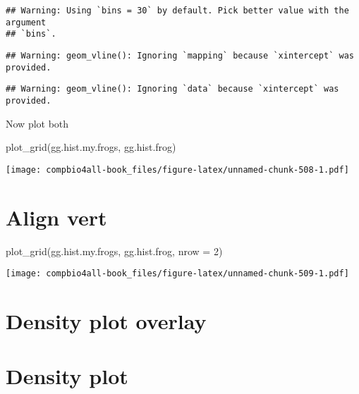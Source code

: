 \documentclass[
]{book}
\newenvironment{Shaded}{\begin{snugshade}}{\end{snugshade}}
\newcommand{\AttributeTok}[1]{\textcolor[rgb]{0.77,0.63,0.00}{#1}}
\newcommand{\DecValTok}[1]{\textcolor[rgb]{0.00,0.00,0.81}{#1}}
\newcommand{\FunctionTok}[1]{\textcolor[rgb]{0.00,0.00,0.00}{#1}}
\newcommand{\NormalTok}[1]{#1}
\begin{document}
\begin{verbatim}
## Warning: Using `bins = 30` by default. Pick better value with the argument
## `bins`.
\end{verbatim}

\begin{verbatim}
## Warning: geom_vline(): Ignoring `mapping` because `xintercept` was provided.
\end{verbatim}

\begin{verbatim}
## Warning: geom_vline(): Ignoring `data` because `xintercept` was provided.
\end{verbatim}

Now plot both

\begin{Shaded}
\begin{Highlighting}[]
\FunctionTok{plot\_grid}\NormalTok{(gg.hist.my.frogs,}
\NormalTok{          gg.hist.frog)}
\end{Highlighting}
\end{Shaded}

\texttt{[image: compbio4all-book\_files/figure-latex/unnamed-chunk-508-1.pdf]}

\hypertarget{align-vert-1}{%
\section{Align vert}\label{align-vert-1}}

\begin{Shaded}
\begin{Highlighting}[]
\FunctionTok{plot\_grid}\NormalTok{(gg.hist.my.frogs, }
\NormalTok{          gg.hist.frog,}
          \AttributeTok{nrow =} \DecValTok{2}\NormalTok{)}
\end{Highlighting}
\end{Shaded}

\texttt{[image: compbio4all-book\_files/figure-latex/unnamed-chunk-509-1.pdf]}

\hypertarget{density-plot-overlay-1}{%
\section{Density plot overlay}\label{density-plot-overlay-1}}

\hypertarget{density-plot-3}{%
\section{Density plot}\label{density-plot-3}}
\end{document}
